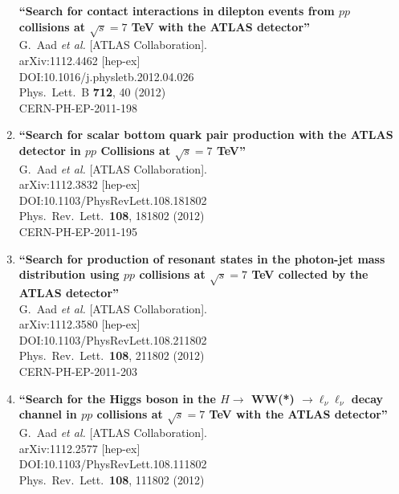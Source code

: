 \documentclass{article}
\begin{document}
\begin{enumerate}
{\bf ``Search for contact interactions in dilepton events from $pp$ collisions at $\sqrt{s}=7$ TeV with the ATLAS detector''}
  \\{}G.~Aad {\it et al.} [ATLAS Collaboration].
  \\{}arXiv:1112.4462 [hep-ex]
  \\{}DOI:10.1016/j.physletb.2012.04.026
  \\{}Phys.\ Lett.\ B {\bf 712}, 40 (2012)
  \\{}CERN-PH-EP-2011-198
\item%
{\bf ``Search for scalar bottom quark pair production with the ATLAS detector in $pp$ Collisions at $\sqrt{s}=7$ TeV''}
  \\{}G.~Aad {\it et al.} [ATLAS Collaboration].
  \\{}arXiv:1112.3832 [hep-ex]
  \\{}DOI:10.1103/PhysRevLett.108.181802
  \\{}Phys.\ Rev.\ Lett.\  {\bf 108}, 181802 (2012)
  \\{}CERN-PH-EP-2011-195
\item%
{\bf ``Search for production of resonant states in the photon-jet mass distribution using $pp$ collisions at $\sqrt{s}=7$ TeV collected by the ATLAS detector''}
  \\{}G.~Aad {\it et al.} [ATLAS Collaboration].
  \\{}arXiv:1112.3580 [hep-ex]
  \\{}DOI:10.1103/PhysRevLett.108.211802
  \\{}Phys.\ Rev.\ Lett.\  {\bf 108}, 211802 (2012)
  \\{}CERN-PH-EP-2011-203
\item%
{\bf ``Search for the Higgs boson in the $H \to$ WW(*) $\to \ell_\nu\ell_\nu$ decay channel in $pp$ collisions at $\sqrt{s}=7$ TeV with the ATLAS detector''}
  \\{}G.~Aad {\it et al.} [ATLAS Collaboration].
  \\{}arXiv:1112.2577 [hep-ex]
  \\{}DOI:10.1103/PhysRevLett.108.111802
  \\{}Phys.\ Rev.\ Lett.\  {\bf 108}, 111802 (2012)

\end{enumerate}
\end{document}
